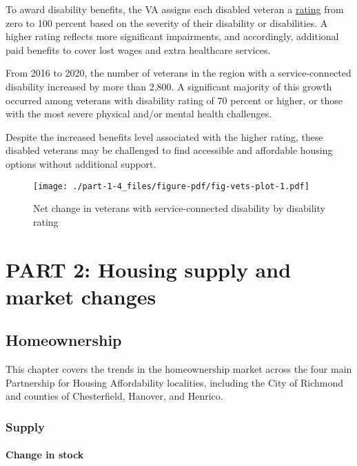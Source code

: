 \documentclass[
  letterpaper,
  DIV=11,
  numbers=noendperiod]{scrreprt}
\begin{document}
To award disability benefits, the VA assigns each disabled veteran a
\href{https://www.va.gov/disability/about-disability-ratings/}{rating}
from zero to 100 percent based on the severity of their disability or
disabilities. A higher rating reflects more significant impairments, and
accordingly, additional paid benefits to cover lost wages and extra
healthcare services.

From 2016 to 2020, the number of veterans in the region with a
service-connected disability increased by more than 2,800. A significant
majority of this growth occurred among veterans with disability rating
of 70 percent or higher, or those with the most severe physical and/or
mental health challenges.

Despite the increased benefits level associated with the higher rating,
these disabled veterans may be challenged to find accessible and
affordable housing options without additional support.

\begin{figure}

{\centering \texttt{[image: ./part-1-4\_files/figure-pdf/fig-vets-plot-1.pdf]}

}

\caption{\label{fig-vets-plot}Net change in veterans with
service-connected disability by disability rating}

\end{figure}

\part{PART 2: Housing supply and market changes}

\hypertarget{part-2-1}{%
\chapter{Homeownership}\label{part-2-1}}

This chapter covers the trends in the homeownership market across the
four main Partnership for Housing Affordability localities, including
the City of Richmond and counties of Chesterfield, Hanover, and Henrico.

\hypertarget{supply}{%
\section{Supply}\label{supply}}

\hypertarget{change-in-stock}{%
\subsection{Change in stock}\label{change-in-stock}}
\end{document}
